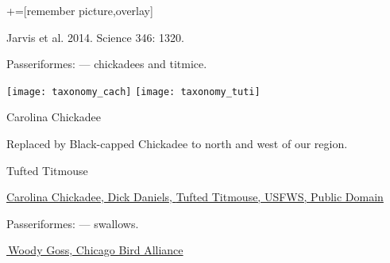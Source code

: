 \documentclass[t]{beamer}
\newcommand{\backoneline}{\vspace{-\baselineskip}}
\begin{document}
{
	{	+=[remember picture,overlay]
		\begin{frame}[b, plain]
			
			\tiny\hfill Jarvis et al. 2014. Science 346: 1320.
		\end{frame}
}}



\begin{frame}{Passeriformes:  — chickadees and titmice.}

	\texttt{[image: taxonomy\_cach]}\hfill
	\texttt{[image: taxonomy\_tuti]}

	\backoneline
	
	\begin{multicols}{2}
		Carolina Chickadee
		
		\medskip
		
		Replaced by Black-capped Chickadee to north and west of our region.
		
		\columnbreak
		
		Tufted Titmouse
	\end{multicols}	
	
	\vfilll
	
	\tiny
	
	\href{https://commons.wikimedia.org/w/index.php?curid=31464294}{Carolina Chickadee, Dick Daniels, } \hfill 
	\href{https://www.flickr.com/photos/43322816@N08/6588366549}{Tufted Titmouse, USFWS, Public Domain}

\end{frame}

%

{
	
	\begin{frame}{Passeriformes:  — swallows.}
		
		\vfilll
		
		\tiny \href{https://chicagobirdalliance.org/blog/2023/6/22/identifying-adult-swallows-in-flight}{\textcopyright\,Woody Goss, Chicago Bird Alliance}
		
		
	\end{frame}
}
\end{document}
